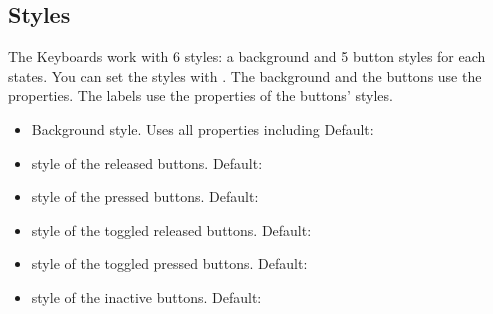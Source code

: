 \documentclass[letterpaper,10pt,english]{sphinxmanual}
\begin{document}
\subsection{Styles}
\label{\detokenize{object-types/kb:styles}}
The Keyboards work with 6 styles: a background and 5 button styles for each states.
You can set the styles with .
The background and the buttons use the  properties.
The labels use the  properties of the buttons’ styles.
\begin{itemize}
\item {} 
 Background style. Uses all  properties including  Default: 

\item {} 
 style of the released  buttons. Default: 

\item {} 
 style of the pressed buttons. Default: 

\item {} 
 style of the toggled released  buttons. Default: 

\item {} 
 style of the toggled pressed  buttons. Default: 

\item {} 
 style of the inactive  buttons. Default: 

\end{itemize}
\end{document}
